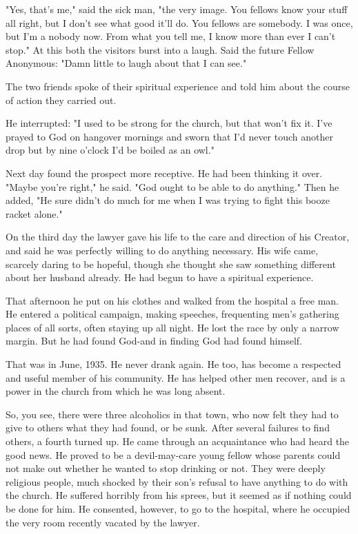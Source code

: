\begin{biblechapter}
"Yes, that's me," said the sick man, "the very image.  You fellows know your stuff all right, but I don't see what good it'll do.  You fellows are somebody.  I was once, but I'm a nobody now.  From what you tell me, I know more than ever I can't stop."  At this both the visitors burst into a laugh.  Said the future Fellow Anonymous: "Damn little to laugh about that I can see."

The two friends spoke of their spiritual experience and told him about the course of action they carried out.

He interrupted: "I used to be strong for the church, but that won't fix it.  I've prayed to God on hangover mornings and sworn that I'd never touch another drop but by nine o'clock I'd be boiled as an owl."

Next day found the prospect more receptive.  He had been thinking it over.  "Maybe you're right," he said.  "God ought to be able to do anything."  Then he added, "He sure didn't do much for me when I was trying to fight this booze racket alone."

On the third day the lawyer gave his life to the care and direction of his Creator, and said he was perfectly willing to do anything necessary.  His wife came, scarcely daring to be hopeful, though she thought she saw something different about her husband already.  He had begun to have a spiritual experience.

That afternoon he put on his clothes and walked from the hospital a free man.  He entered a political campaign, making speeches, frequenting men's gathering places of all sorts, often staying up all night.  He lost the race by only a narrow margin.  But he had found God-and in finding God had found himself.

That was in June, 1935.  He never drank again.  He too, has become a respected and useful member of his community.  He has helped other men recover, and is a power in the church from which he was long absent.

So, you see, there were three alcoholics in that town, who now felt they had to give to others what they had found, or be sunk.  After several failures to find others, a fourth turned up.  He came through an acquaintance who had heard the good news.  He proved to be a devil-may-care young fellow whose parents could not make out whether he wanted to stop drinking or not.  They were deeply religious people, much shocked by their son's refusal to have anything to do with the church.  He suffered horribly from his sprees, but it seemed as if nothing could be done for him.  He consented, however, to go to the hospital, where he occupied the very room recently vacated by the lawyer.


\end{biblechapter}
